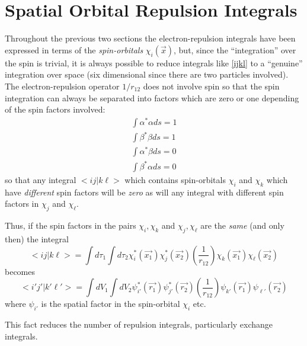 \section{\sf Spatial Orbital Repulsion Integrals}
Throughout the previous two sections the electron-repulsion
integrals have been expressed in terms of the {\em spin-orbitals}
$\chi_i (\vec{x})$, but, since the ``integration'' over
the spin is trivial, it is always possible to reduce integrals like
\ref{ijkl} to a ``genuine'' integration over space (six
dimensional since there are two particles involved). The electron-repulsion
operator $1/r_{12}$ does not involve spin so that the spin integration can
always be separated into factors which are zero or one depending of the
spin factors involved:
\begin{eqnarray}
\int { \alpha^* \alpha ds } = 1 \\
\int { \beta^* \beta ds } = 1 \\
\int { \alpha^* \beta ds } = 0 \\
\int { \beta^* \alpha ds } = 0 
\label{spinints}
\end{eqnarray}
so that any integral $<i j | k \ell >$ which contains
spin-orbitals $\chi_i$ and $\chi_k$ which have
{\em different} spin factors will be {\em zero} as will
any integral with different spin factors in $\chi_j$ and
$\chi_{\ell}$.

Thus, if the spin factors in the pairs $\chi_i , \chi_k$
and $\chi_j , \chi_{\ell} $ are the {\em same} (and only then)
the integral
\begin{equation}
 < i j | k \ell > = 
\int { d\tau_1 \int { d\tau_2 \chi_i^* (\vec{x_1})\chi_j^* (\vec{x_2})
\left ( \frac{1}{r_{12}} \right )
\chi_k (\vec{x_1})\chi_{\ell} (\vec{x_2}) } }
\end{equation}
becomes
\begin{equation}
 < i' j' | k' \ell ' > = 
\int { dV_1 \int { dV_2 \psi_{i'}^* (\vec{r_1})\psi_{j'}^* (\vec{r_2})
\left ( \frac{1}{r_{12}} \right )
\psi_{k'} (\vec{r_1})\psi_{\ell '} (\vec{r_2}) } }
\end{equation}
where $\psi_{i'}$ is the spatial factor in the spin-orbital
$\chi_i$ etc.

This fact reduces the number of repulsion integrals, particularly
exchange integrals.
